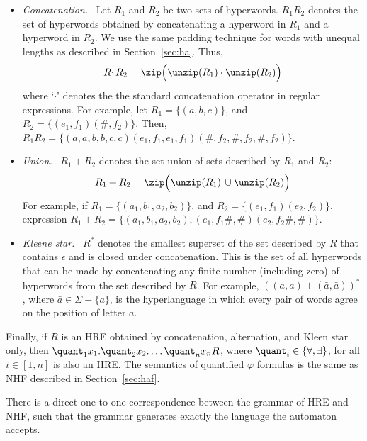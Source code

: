 \begin{itemize}
\item {\em Concatenation.} \ Let $R_1$ and $R_2$ be two sets of hyperwords. 
$R_1R_2$ denotes the set of hyperwords obtained by concatenating a hyperword in 
$R_1$ and a hyperword in $R_2$. We use the same padding technique for words 
with unequal lengths as described in Section~\ref{sec:ha}. Thus,
%
$$
R_1R_2 = \zip \Big(\unzip(R_1)\cdot\unzip(R_2)\Big)
$$
%
where `$\cdot$' denotes the the standard concatenation operator in regular 
expressions.
For example, let $R_1 
= \{(a, b, c)\}$, and $R_2 = \{(e_1, f_1)(\#, f_2)\}$. Then, 
$R_1R_2 = \{(a, a, b, b, c, c)(e_1, f_1, e_1, f_1)(\#, f_2, \#, 
f_2, \#, f_2)\}$.

\item {\em Union.} \ $R_1 + R_2$ denotes the set union of sets described 
by $R_1$ and $R_2$:
%
$$
R_1 + R_2 = \zip\Big(\unzip(R_1) \, \cup \unzip(R_2)\Big)
$$
%
For example, if $R_1 = \{(a_1, b_1, a_2, b_2)\}$, and $R_2 
= \{(e_1, f_1)(e_2, f_2)\}$, expression $R_1 + R_2 = 
\{(a_1,b_1, a_2, b_2), (e_1, f_1 \#, \#)(e_2, f_2 \#, \#)\}$.

\item {\em Kleene star.} \ $R^*$ denotes the smallest superset of the set 
described by $R$ that contains $\epsilon$ and is closed under concatenation. 
This is the set of all hyperwords that can be made by concatenating any finite 
number (including zero) of hyperwords from the set described by $R$. For 
example, $((a, a) + (\bar{a}, \bar{a}))^*$, where $\bar{a} \in \Sigma - 
\{a\}$, is the hyperlanguage in which every pair of words agree on the 
position of letter $a$.

\end{itemize}
%
Finally, if $R$ is an HRE obtained by concatenation, alternation, and Kleen 
star only, then $\quant_1x_1.\quant_2x_2.\ldots 
\quant_nx_n R$, where $\quant_i \in \{\forall, \exists\}$, for all $i \in [1, 
n]$ is also an HRE. The semantics of quantified $\varphi$ formulas is the same 
as NHF described in Section~\ref{sec:haf}. 

\begin{theorem}

There is a direct one-to-one correspondence between the grammar of HRE and 
NHF, such that the grammar generates exactly the language the automaton accepts.

\end{theorem}

